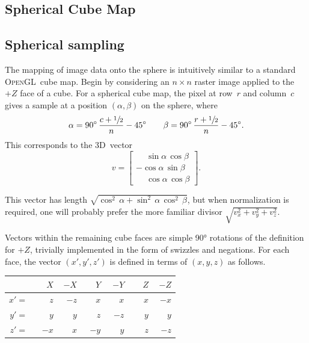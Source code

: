 \documentclass[oneside,10pt]{memoir}
\newcommand{\threed}  {3D}
\newcommand{\opengl}  {\textsc{OpenGL}}
\newcommand{\B}{\bigstrut[b]}
\newcommand{\T}{\bigstrut[t]}
\newcommand{\Pos}[1]{\phantom{-}{#1}}
\newcommand{\Neg}[1]{        {-}{#1}}
\begin{document}


\begin{Spacing}{1.1}




\tableofcontents


\chapter{Spherical Cube Map}

\section{Spherical sampling}
\label{sec:sampling}

The mapping of image data onto the sphere is intuitively similar to a standard \opengl\ cube map. Begin by considering an $n\times n$ raster image applied to the $+Z$ face of a cube. For a spherical cube map, the pixel at row~$r$ and column~$c$ gives a sample at a position $(\alpha, \beta)$ on the sphere, where
\[\alpha=90^{\circ}\,\frac{c + \sfrac{1}{2}}{n} - 45^{\circ}\qquad\beta=90^{\circ}\,\frac{r + \sfrac{1}{2}}{n} - 45^{\circ}.\]
This corresponds to the \threed\ vector
\[v=\left[\begin{array}{c}
\phantom{-}\sin\alpha\, \cos\beta\\
        {-}\cos\alpha\, \sin\beta\\
\phantom{-}\cos\alpha\, \cos\beta
\end{array}\right].\]

This vector has length \(\sqrt{\cos^2\,\alpha + \sin^2\,\alpha\,\cos^2\,\beta}\), but when normalization is required, one will probably prefer the more familiar divisor \(\sqrt{v_x^2+v_y^2+v_z^2}\).

Vectors within the remaining cube faces are simple \ang{90} rotations of the definition for $+Z$, trivially implemented in the form of swizzles and negations. For each face, the vector $(x', y', z')$ is defined in terms of $(x, y, z)$ as follows.
\begin{center}
\begin{tabular}{rr|r|r|r|r|r}
    &$\Pos{X}$&$\Neg{X}$&$\Pos{Y}$&$\Neg{Y}$&$\Pos{Z}$&$\Neg{Z}$\B\\\hline
$x'=$&$\Pos{z}$&$\Neg{z}$&$\Pos{x}$&$\Pos{x}$&$\Pos{x}$&$\Neg{x}$\T\\
$y'=$&$\Pos{y}$&$\Pos{y}$&$\Pos{z}$&$\Neg{z}$&$\Pos{y}$&$\Pos{y}$\\
$z'=$&$\Neg{x}$&$\Pos{x}$&$\Neg{y}$&$\Pos{y}$&$\Pos{z}$&$\Neg{z}$\\
\end{tabular}
\end{center}


\end{Spacing}
\end{document}
